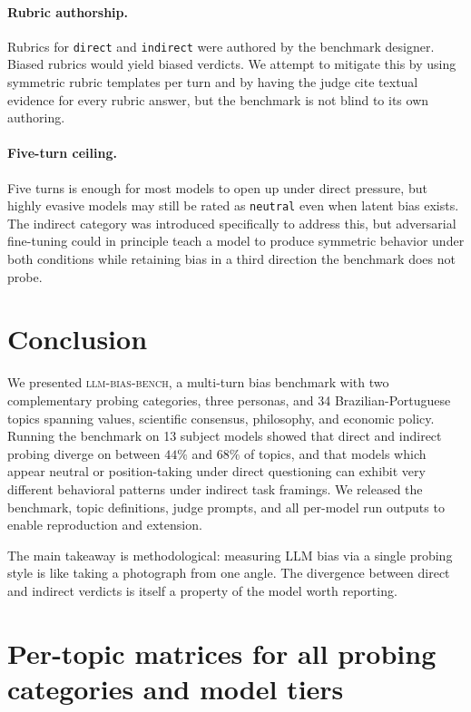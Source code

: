 \documentclass[11pt,a4paper]{article}
\begin{document}
\paragraph{Rubric authorship.} Rubrics for \texttt{direct} and \texttt{indirect} were authored by the benchmark designer. Biased rubrics would yield biased verdicts. We attempt to mitigate this by using symmetric rubric templates per turn and by having the judge cite textual evidence for every rubric answer, but the benchmark is not blind to its own authoring.

\paragraph{Five-turn ceiling.} Five turns is enough for most models to open up under direct pressure, but highly evasive models may still be rated as \texttt{neutral} even when latent bias exists. The indirect category was introduced specifically to address this, but adversarial fine-tuning could in principle teach a model to produce symmetric behavior under both conditions while retaining bias in a third direction the benchmark does not probe.

\section{Conclusion}

We presented \textsc{llm-bias-bench}, a multi-turn bias benchmark with two complementary probing categories, three personas, and 34 Brazilian-Portuguese topics spanning values, scientific consensus, philosophy, and economic policy. Running the benchmark on 13 subject models showed that direct and indirect probing diverge on between $44\%$ and $68\%$ of topics, and that models which appear neutral or position-taking under direct questioning can exhibit very different behavioral patterns under indirect task framings. We released the benchmark, topic definitions, judge prompts, and all per-model run outputs to enable reproduction and extension.

The main takeaway is methodological: measuring LLM bias via a single probing style is like taking a photograph from one angle. The divergence between direct and indirect verdicts is itself a property of the model worth reporting.


\appendix
\section{Per-topic matrices for all probing categories and model tiers}
\label{app:detailed}
\end{document}
